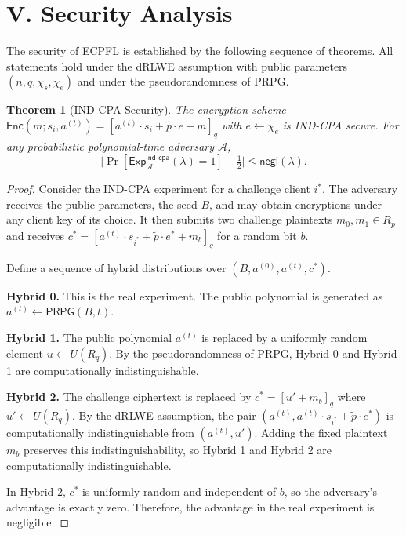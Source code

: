 \documentclass[10pt]{article}
\newtheorem{theorem}{Theorem}
\begin{document}
\section*{V. Security Analysis}

The security of ECPFL is established by the following sequence of theorems. All statements hold under the dRLWE assumption with public parameters $(n,q,\chi_s,\chi_e)$ and under the pseudorandomness of PRPG.

\begin{theorem}[IND-CPA Security]
The encryption scheme $\mathsf{Enc}(m;s_i,a^{(t)})=[a^{(t)}\cdot s_i+\tilde{p}\cdot e+m]_q$ with $e\leftarrow\chi_e$ is IND-CPA secure. For any probabilistic polynomial-time adversary $\mathcal{A}$,
\[
\bigl|\Pr[\mathsf{Exp}^{\mathsf{ind\text{-}cpa}}_{\mathcal{A}}(\lambda)=1]-\tfrac{1}{2}\bigr|\le\mathsf{negl}(\lambda).
\]
\end{theorem}

\begin{proof}
Consider the IND-CPA experiment for a challenge client $i^*$. The adversary receives the public parameters, the seed $B$, and may obtain encryptions under any client key of its choice. It then submits two challenge plaintexts $m_0,m_1\in R_p$ and receives $c^*=[a^{(t)}\cdot s_{i^*}+\tilde{p}\cdot e^*+m_b]_q$ for a random bit $b$.

Define a sequence of hybrid distributions over $(B,a^{(0)},a^{(t)},c^*)$.

\textbf{Hybrid 0.} This is the real experiment. The public polynomial is generated as $a^{(t)}\leftarrow\mathsf{PRPG}(B,t)$.

\textbf{Hybrid 1.} The public polynomial $a^{(t)}$ is replaced by a uniformly random element $u\leftarrow U(R_q)$. By the pseudorandomness of PRPG, Hybrid 0 and Hybrid 1 are computationally indistinguishable.

\textbf{Hybrid 2.} The challenge ciphertext is replaced by $c^*=[u'+m_b]_q$ where $u'\leftarrow U(R_q)$. By the dRLWE assumption, the pair $(a^{(t)},a^{(t)}\cdot s_{i^*}+\tilde{p}\cdot e^*)$ is computationally indistinguishable from $(a^{(t)},u')$. Adding the fixed plaintext $m_b$ preserves this indistinguishability, so Hybrid 1 and Hybrid 2 are computationally indistinguishable.

In Hybrid 2, $c^*$ is uniformly random and independent of $b$, so the adversary's advantage is exactly zero. Therefore, the advantage in the real experiment is negligible.
\end{proof}
\end{document}
